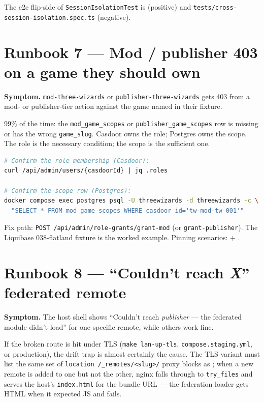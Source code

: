 \documentclass[11pt,a4paper,openany]{book}
\begin{document}
The e2e flip-side of \texttt{SessionIsolationTest} is
 (positive)
and \texttt{tests/cross-session-isolation.spec.ts} (negative).

\chapter{Runbook 7 --- Mod / publisher 403 on a game they should own}
\textbf{Symptom.} \texttt{mod-three-wizards} or
\texttt{publisher-three-wizards} gets 403 from a mod- or
publisher-tier action against the game named in their fixture.

99\% of the time: the \texttt{mod\_game\_scopes} or
\texttt{publisher\_game\_scopes} row is missing or has the wrong
\texttt{game\_slug}. Casdoor owns the role; Postgres owns the scope.
The role is the necessary condition; the scope is the sufficient one.

\begin{lstlisting}[language=bash]
# Confirm the role membership (Casdoor):
curl /api/admin/users/{casdoorId} | jq .roles

# Confirm the scope row (Postgres):
docker compose exec postgres psql -U threewizards -d threewizards -c \
  "SELECT * FROM mod_game_scopes WHERE casdoor_id='tw-mod-tw-001'"
\end{lstlisting}

Fix path: \texttt{POST /api/admin/role-grants/grant-mod} (or
\texttt{grant-publisher}). The Liquibase 038-flatland fixture is the
worked example. Pinning scenarios:
 +
.

\chapter{Runbook 8 --- ``Couldn't reach \emph{X}'' federated remote}
\textbf{Symptom.} The host shell shows
``Couldn't reach \emph{publisher} --- the federated module didn't
load'' for one specific remote, while others work fine.

If the broken route is hit under TLS (\texttt{make lan-up-tls},
\texttt{compose.staging.yml}, or production), the
 drift trap is almost certainly the
cause. The TLS variant must list the same set of
\texttt{location /\_remotes/<slug>/} proxy blocks as
; when a new remote is added to one but
not the other, nginx falls through to \texttt{try\_files} and serves
the host's \texttt{index.html} for the bundle URL --- the federation
loader gets HTML when it expected JS and fails.
\end{document}

